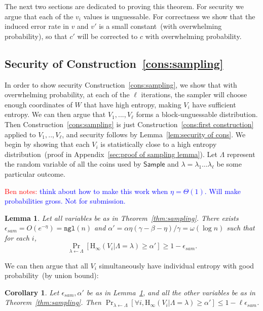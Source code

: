 \documentclass[11pt]{article}
\newcommand{\apref}[1]{\mbox{Appendix~\ref{#1}}}
\newcommand{\thref}[1]{\mbox{Theorem~\ref{#1}}}
\newcommand{\lemref}[1]{\mbox{Lemma~\ref{#1}}}
\newcommand{\consref}[1]{\mbox{Construction~\ref{#1}}}
\newcommand{\class}[1]{{\ensuremath{\mathsf{#1}}}}
\newcommand{\sample}{\ensuremath{\class{Sample}}\xspace}
\newcommand{\ngl}{\ensuremath{\mathtt{ngl}}\xspace}
\newcommand{\Hoo}{\mathrm{H}_\infty}
\newtheorem{lemma}[theorem]{Lemma}
\newtheorem{corollary}[theorem]{Corollary}
\newcommand{\authnote}[2]{{\textcolor{red}{\textsf{#1 notes: }\textcolor{blue}{ #2}}\marginpar{\textcolor{red}{\textbf{!!!!!}}}}}
\newcommand{\authnote}[2]{}
\newcommand{\bnote}[1]{{\authnote{Ben}{#1}}}
\begin{document}
The next two sections are dedicated to proving this theorem.
 For security we argue that each of the $v_i$ values is unguessable.  For correctness we show that the induced error rate in $v$ and $v'$ is a small constant~(with overwhelming probability), so that $c'$ will be corrected to $c$ with overwhelming probability.

\subsection{Security of \consref{cons:sampling}}
In order to show security \consref{cons:sampling}, we
show that with overwhelming probability, at each of the $\ell$ iterations, the sampler will choose enough coordinates of $W$ that have high entropy, making $V_i$ have sufficient entropy.   We can then argue that $V_1,..., V_\ell$ forms a block-unguessable distribution.  Then \consref{cons:sampling} is just \consref{cons:first construction} applied to $V_1,.., V_\ell$, and security follows by \lemref{lem:security of cons}.  We begin by showing that each $V_i$ is statistically close to a high entropy distribution~(proof in \apref{sec:proof of sampling lemma}).   Let $\Lambda$ represent the random variable of all the coins used by $\sample$ and $\lambda=\lambda_1 \dots \lambda_\ell$
be some particular outcome.

\bnote{think about how to make this work when $\eta = \Theta(1)$.  Will make probabilities gross.  Not for submission.}
\begin{lemma}
\label{lem:sampling works}
Let all variables be as in \thref{thm:sampling}.
There exists $\epsilon_{sam} = O(e^{-\eta}) = \ngl(n)$ and $\alpha' = \alpha\eta(\gamma-\beta-\eta)/\gamma = \omega(\log n)$ such that for each $i$,
\[
\Pr_{\lambda\leftarrow \Lambda}[\Hoo(V_i | \Lambda= \lambda) \geq \alpha'] \geq 1- \epsilon_{sam}.
\]
\end{lemma}

\noindent
We can then argue that all $V_i$ simultaneously have individual entropy with good probability~(by union bound):
\begin{corollary}
\label{cor:samp sec}
 Let $\epsilon_{sam}, \alpha'$ be as in \lemref{lem:sampling works}, and all the other variables be as in \thref{thm:sampling}.  Then $\Pr_{\lambda\leftarrow \Lambda}[\forall i, \Hoo(V_i | \Lambda = \lambda)  \ge \alpha'] \leq 1-\ell\epsilon_{sam}$.
\end{corollary}
\end{document}
